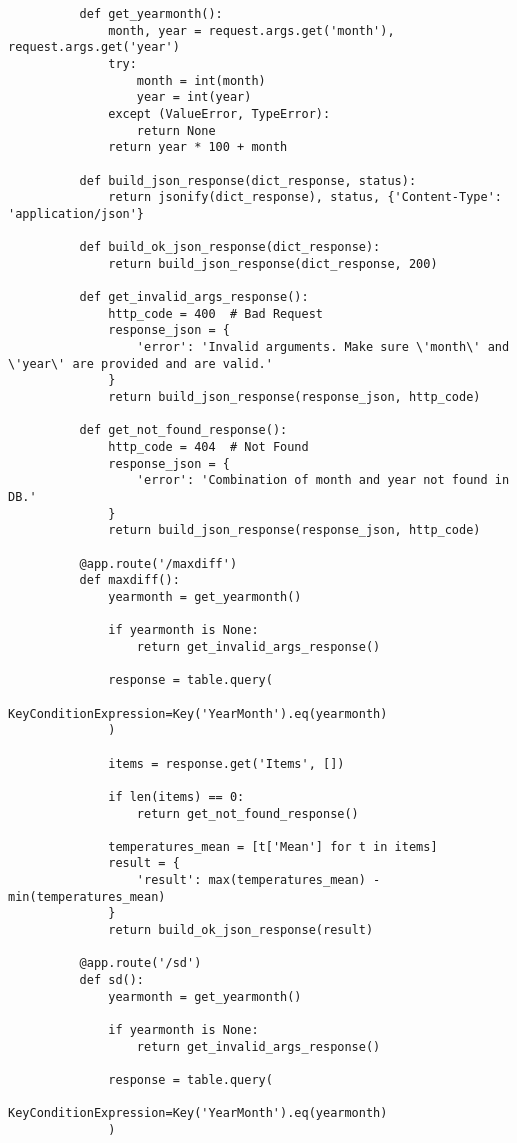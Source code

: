 \begin{verbatim}
          def get_yearmonth():
              month, year = request.args.get('month'), request.args.get('year')
              try:
                  month = int(month)
                  year = int(year)
              except (ValueError, TypeError):
                  return None
              return year * 100 + month

          def build_json_response(dict_response, status):
              return jsonify(dict_response), status, {'Content-Type': 'application/json'}

          def build_ok_json_response(dict_response):
              return build_json_response(dict_response, 200)

          def get_invalid_args_response():
              http_code = 400  # Bad Request
              response_json = {
                  'error': 'Invalid arguments. Make sure \'month\' and \'year\' are provided and are valid.'
              }
              return build_json_response(response_json, http_code)

          def get_not_found_response():
              http_code = 404  # Not Found
              response_json = {
                  'error': 'Combination of month and year not found in DB.'
              }
              return build_json_response(response_json, http_code)

          @app.route('/maxdiff')
          def maxdiff():
              yearmonth = get_yearmonth()

              if yearmonth is None:
                  return get_invalid_args_response()

              response = table.query(
                  KeyConditionExpression=Key('YearMonth').eq(yearmonth)
              )

              items = response.get('Items', [])

              if len(items) == 0:
                  return get_not_found_response()

              temperatures_mean = [t['Mean'] for t in items]
              result = {
                  'result': max(temperatures_mean) - min(temperatures_mean)
              }
              return build_ok_json_response(result)

          @app.route('/sd')
          def sd():
              yearmonth = get_yearmonth()

              if yearmonth is None:
                  return get_invalid_args_response()

              response = table.query(
                  KeyConditionExpression=Key('YearMonth').eq(yearmonth)
              )


\end{verbatim}
